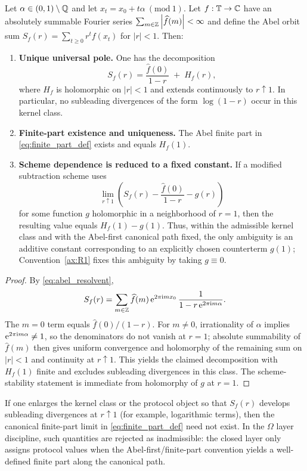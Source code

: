\begin{proposition}
\label{prop:abel_scheme_independence}
Let $\alpha\in(0,1)\setminus\mathbb{Q}$ and let $x_t=x_0+t\alpha\ (\mathrm{mod}\ 1)$.
Let $f:\mathbb{T}\to\mathbb{C}$ have an absolutely summable Fourier series $\sum_{m\in\mathbb{Z}}\left\lvert \widehat f(m)\right\rvert<\infty$ and define the Abel orbit sum $S_f(r)=\sum_{t\ge 0} r^t f(x_t)$ for $|r|<1$.
Then:
\begin{enumerate}
\item \textbf{Unique universal pole.}
One has the decomposition
\[
S_f(r)=\frac{\widehat f(0)}{1-r}\;+\;H_f(r),
\]
where $H_f$ is holomorphic on $|r|<1$ and extends continuously to $r\uparrow 1$.
In particular, no subleading divergences of the form $\log(1-r)$ occur in this kernel class.
\item \textbf{Finite-part existence and uniqueness.}
The Abel finite part in \eqref{eq:finite_part_def} exists and equals $H_f(1)$.
\item \textbf{Scheme dependence is reduced to a fixed constant.}
If a modified subtraction scheme uses
\[
\lim_{r\uparrow 1}\left(S_f(r)-\frac{\widehat f(0)}{1-r}-g(r)\right)
\]
for some function $g$ holomorphic in a neighborhood of $r=1$, then the resulting value equals $H_f(1)-g(1)$.
Thus, within the admissible kernel class and with the Abel-first canonical path fixed, the only ambiguity is an additive constant corresponding to an explicitly chosen counterterm $g(1)$; Convention~\ref{ax:R1} fixes this ambiguity by taking $g\equiv 0$.
\end{enumerate}
\end{proposition}

\begin{proof}
By \eqref{eq:abel_resolvent},
\[
S_f(r)=\sum_{m\in\mathbb{Z}}\widehat f(m)\,\mathrm{e}^{2\pi\mathrm{i} m x_0}\,\frac{1}{1-r\,\mathrm{e}^{2\pi\mathrm{i} m\alpha}}.
\]
The $m=0$ term equals $\widehat f(0)/(1-r)$.
For $m\neq 0$, irrationality of $\alpha$ implies $\mathrm{e}^{2\pi\mathrm{i} m\alpha}\neq 1$, so the denominators do not vanish at $r=1$; absolute summability of $\widehat f(m)$ then gives uniform convergence and holomorphy of the remaining sum on $|r|<1$ and continuity at $r\uparrow 1$.
This yields the claimed decomposition with $H_f(1)$ finite and excludes subleading divergences in this class.
The scheme-stability statement is immediate from holomorphy of $g$ at $r=1$.
\end{proof}

\begin{remark}
\label{rem:abel_inadmissibility}
If one enlarges the kernel class or the protocol object so that $S_f(r)$ develops subleading divergences at $r\uparrow 1$ (for example, logarithmic terms), then the canonical finite-part limit in \eqref{eq:finite_part_def} need not exist.
In the $\Omega$ layer discipline, such quantities are rejected as inadmissible: the closed layer only assigns protocol values when the Abel-first/finite-part convention yields a well-defined finite part along the canonical path.
\end{remark}

